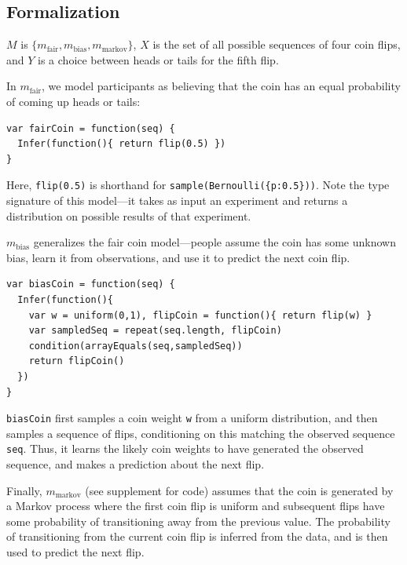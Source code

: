 \documentclass{article}
\begin{document}
\subsection{Formalization}

$M$ is $\{m_{\text{fair}}, m_{\text{bias}}, m_{\text{markov}}\}$, $X$ is the set of all possible sequences of four coin flips, and $Y$ is a choice between heads or tails for the fifth flip.

In $m_{\text{fair}}$, we model participants as believing that the coin has an equal probability of coming up heads or tails:
\begin{lstlisting}[upquote=true]
var fairCoin = function(seq) {
  Infer(function(){ return flip(0.5) })
}
\end{lstlisting}
Here, \lstinline{flip(0.5)} is shorthand for \lstinline|sample(Bernoulli({p:0.5}))|.
Note the type signature of this model---it takes as input an experiment and returns a distribution on possible results of that experiment.

$m_{\text{bias}}$ generalizes the fair coin model---people assume the coin has some unknown bias, learn it from observations, and use it to predict the next coin flip.
\begin{lstlisting}[upquote=true]
var biasCoin = function(seq) {
  Infer(function(){
    var w = uniform(0,1), flipCoin = function(){ return flip(w) }
    var sampledSeq = repeat(seq.length, flipCoin)
    condition(arrayEquals(seq,sampledSeq))
    return flipCoin()
  })
}
\end{lstlisting}
\lstinline{biasCoin} first samples a coin weight \lstinline{w} from a uniform distribution, and then samples a sequence of flips, conditioning on this matching the observed sequence \lstinline{seq}.
Thus, it learns the likely coin weights to have generated the observed sequence, and makes a prediction about the next flip.

Finally, $m_{\text{markov}}$ (see supplement for code) assumes that the coin is generated by a Markov process where the first coin flip is uniform and subsequent flips have some probability of transitioning away from the previous value.
The probability of transitioning from the current coin flip is inferred from the data, and is then used to predict the next flip.

\end{document}
